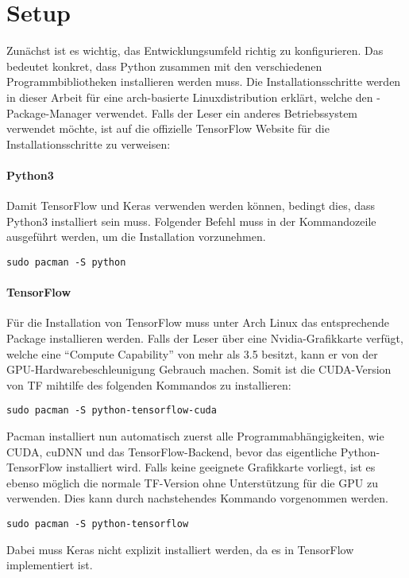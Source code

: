 \para{}
\cite{net:mnist}

\section{Setup}
Zunächst ist es wichtig, das Entwicklungsumfeld richtig zu konfigurieren. Das
bedeutet konkret, dass Python zusammen mit den verschiedenen Programmbibliotheken
installieren werden muss.
\para{}
Die Installationsschritte werden in dieser Arbeit für eine arch-basierte
Linuxdistribution erklärt, welche den -Package-Manager verwendet.
\para{}
Falls der Leser ein anderes Betriebssystem verwendet möchte, ist auf die offizielle
TensorFlow Website für die Installationsschritte zu verweisen:
\para{}

\paragraph{Python3}
Damit TensorFlow und Keras verwenden werden können, bedingt dies, dass Python3
installiert sein muss.
Folgender Befehl muss in der Kommandozeile ausgeführt werden, um die
Installation vorzunehmen.
\begin{verbatim}
sudo pacman -S python
\end{verbatim}

\paragraph{TensorFlow}
Für die Installation von TensorFlow muss unter Arch Linux das entsprechende
Package installieren werden.
Falls der Leser über eine Nvidia-Grafikkarte verfügt, welche eine ``Compute
Capability'' von mehr als 3.5 besitzt, kann er von der
GPU-Hardwarebeschleunigung Gebrauch machen.
Somit ist die CUDA-Version von TF mihtilfe des folgenden Kommandos zu installieren:
\begin{verbatim}
sudo pacman -S python-tensorflow-cuda
\end{verbatim}
Pacman installiert nun automatisch zuerst alle Programmabhängigkeiten, wie
CUDA, cuDNN und das TensorFlow-Backend, bevor das eigentliche
Python-TensorFlow installiert wird.
\para{}
Falls keine geeignete Grafikkarte vorliegt, ist es ebenso möglich die normale
TF-Version ohne Unterstützung für die GPU zu verwenden.
Dies kann durch nachstehendes Kommando vorgenommen werden.
\begin{verbatim}
sudo pacman -S python-tensorflow
\end{verbatim}
\para{}
Dabei muss Keras nicht explizit installiert werden, da es in TensorFlow implementiert ist.

